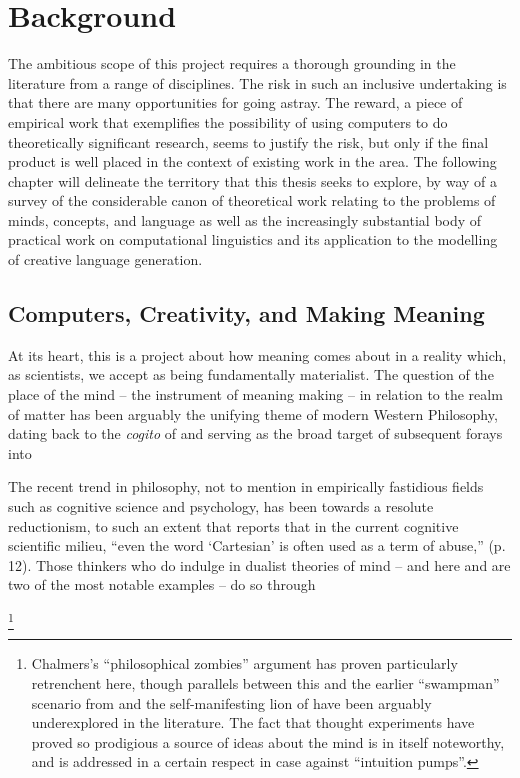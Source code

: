 \chapter{Background}
The ambitious scope of this project requires a thorough grounding in the literature from a range of disciplines.  The risk in such an inclusive undertaking is that there are many opportunities for going astray.  The reward, a piece of empirical work that exemplifies the possibility of using computers to do theoretically significant research, seems to justify the risk, but only if the final product is well placed in the context of existing work in the area.  The following chapter will delineate the territory that this thesis seeks to explore, by way of a survey of the considerable canon of theoretical work relating to the problems of minds, concepts, and language as well as the increasingly substantial body of practical work on computational linguistics and its application to the modelling of creative language generation.

\section{Computers, Creativity, and Making Meaning}
At its heart, this is a project about how meaning comes about in a reality which, as scientists, we accept as being fundamentally materialist.  The question of the place of the mind -- the instrument of meaning making -- in relation to the realm of matter has been arguably the unifying theme of modern Western Philosophy, dating back to the \emph{cogito} of \cite{Descartes} and serving as the broad target of subsequent forays into 

The recent trend in philosophy, not to mention in empirically fastidious fields such as cognitive science and psychology, has been towards a resolute reductionism, to such an extent that \cite{Rowlands} reports that in the current cognitive scientific milieu, ``even the word `Cartesian' is often used as a term of abuse,'' (p. 12).  Those thinkers who do indulge in dualist theories of mind -- and here \cite{Chalmers1996} and \cite{Fodor2008} are two of the most notable examples -- do so through 

\footnote{Chalmers's ``philosophical zombies'' argument has proven particularly retrenchent here, though parallels between this and the earlier ``swampman'' scenario from \cite{Davidson} and the self-manifesting lion of \cite{Milikan} have been arguably underexplored in the literature.  The fact that thought experiments have proved so prodigious a source of ideas about the mind is in itself noteworthy, and is addressed in a certain respect in  case against ``intuition pumps''.}

